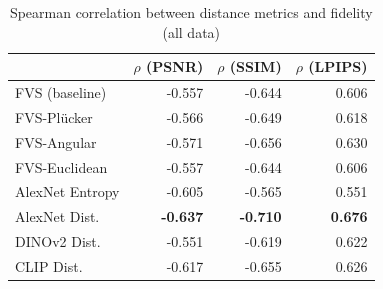 \begin{table}[htbp]
\centering
\caption{Spearman correlation between distance metrics and fidelity (all data)}
\label{tab:correlation_overall}
\begin{tabular}{lrrr}
\toprule
 & $\rho$ (PSNR) & $\rho$ (SSIM) & $\rho$ (LPIPS) \\
\midrule
FVS (baseline) & -0.557 & -0.644 & 0.606 \\
FVS-Pl\"ucker & -0.566 & -0.649 & 0.618 \\
FVS-Angular & -0.571 & -0.656 & 0.630 \\
FVS-Euclidean & -0.557 & -0.644 & 0.606 \\
AlexNet Entropy & -0.605 & -0.565 & 0.551 \\
AlexNet Dist. & \textbf{-0.637} & \textbf{-0.710} & \textbf{0.676} \\
DINOv2 Dist. & -0.551 & -0.619 & 0.622 \\
CLIP Dist. & -0.617 & -0.655 & 0.626 \\
\bottomrule
\end{tabular}
\end{table}